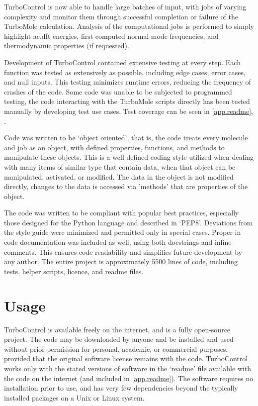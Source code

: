 TurboControl is now able to handle large batches of input, with jobs of varying complexity and monitor them through successful completion or failure of the TurboMole calculation. Analysis of the computational jobs is performed to simply highlight \gls{ac.dft} energies, first computed normal mode frequencies, and thermodynamic properties (if requested).  

Development of TurboControl contained extensive testing at every step. Each function was tested as extensively as possible, including edge cases, error cases, and null inputs. This testing minimizes runtime errors, reducing the frequency of crashes of the code. Some code was unable to be subjected to programmed testing, the code interacting with the TurboMole scripts directly has been tested manually by developing test use cases. Test coverage can be seen in \autoref{app.readme}, .

Code was written to be `object oriented', that is, the code treats every molecule and job as an object, with defined properties, functions, and methods to manipulate these objects. This is a well defined coding style utilized when dealing with many items of similar type that contain data, when that object can be manipulated, activated, or modified. The data in the object is not modified directly, changes to the data is accessed via 'methods' that are properties of the object.

The code was written to be compliant with popular best practices, especially those designed for the Python language and described in `PEP8'\autocite{pep8}. Deviations from the style guide were minimized and permitted only in special cases. Proper in code documentation was included as well, using both docstrings and inline comments\autocite{pep257}. This ensures code readability and simplifies future development by any author. The entire project is approximately 5500 lines of code, including tests, helper scripts, licence, and readme files. 

\section{Usage}

TurboControl is available freely on the internet, and is a fully open-source project\autocite{bulsink2014}. The code may be downloaded by anyone and be installed and used without prior permission for personal, academic, or commercial purposes, provided that the original software license remains with the code. TurboControl works only with the stated versions of software in the `readme' file available with the code on the internet (and included in \autoref{app.readme}). The software requires no installation prior to use, and has very few dependencies beyond the typically installed packages on a Unix or Linux system. 

